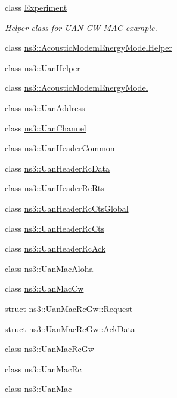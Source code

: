 \begin{DoxyCompactItemize}
\item 
class \hyperlink{classExperiment}{Experiment}
\begin{DoxyCompactList}\small\item\em Helper class for U\+AN CW M\+AC example. \end{DoxyCompactList}\item 
class \hyperlink{classns3_1_1AcousticModemEnergyModelHelper}{ns3\+::\+Acoustic\+Modem\+Energy\+Model\+Helper}
\item 
class \hyperlink{classns3_1_1UanHelper}{ns3\+::\+Uan\+Helper}
\item 
class \hyperlink{classns3_1_1AcousticModemEnergyModel}{ns3\+::\+Acoustic\+Modem\+Energy\+Model}
\item 
class \hyperlink{classns3_1_1UanAddress}{ns3\+::\+Uan\+Address}
\item 
class \hyperlink{classns3_1_1UanChannel}{ns3\+::\+Uan\+Channel}
\item 
class \hyperlink{classns3_1_1UanHeaderCommon}{ns3\+::\+Uan\+Header\+Common}
\item 
class \hyperlink{classns3_1_1UanHeaderRcData}{ns3\+::\+Uan\+Header\+Rc\+Data}
\item 
class \hyperlink{classns3_1_1UanHeaderRcRts}{ns3\+::\+Uan\+Header\+Rc\+Rts}
\item 
class \hyperlink{classns3_1_1UanHeaderRcCtsGlobal}{ns3\+::\+Uan\+Header\+Rc\+Cts\+Global}
\item 
class \hyperlink{classns3_1_1UanHeaderRcCts}{ns3\+::\+Uan\+Header\+Rc\+Cts}
\item 
class \hyperlink{classns3_1_1UanHeaderRcAck}{ns3\+::\+Uan\+Header\+Rc\+Ack}
\item 
class \hyperlink{classns3_1_1UanMacAloha}{ns3\+::\+Uan\+Mac\+Aloha}
\item 
class \hyperlink{classns3_1_1UanMacCw}{ns3\+::\+Uan\+Mac\+Cw}
\item 
struct \hyperlink{structns3_1_1UanMacRcGw_1_1Request}{ns3\+::\+Uan\+Mac\+Rc\+Gw\+::\+Request}
\item 
struct \hyperlink{structns3_1_1UanMacRcGw_1_1AckData}{ns3\+::\+Uan\+Mac\+Rc\+Gw\+::\+Ack\+Data}
\item 
class \hyperlink{classns3_1_1UanMacRcGw}{ns3\+::\+Uan\+Mac\+Rc\+Gw}
\item 
class \hyperlink{classns3_1_1UanMacRc}{ns3\+::\+Uan\+Mac\+Rc}
\item 
class \hyperlink{classns3_1_1UanMac}{ns3\+::\+Uan\+Mac}

\end{DoxyCompactItemize}
